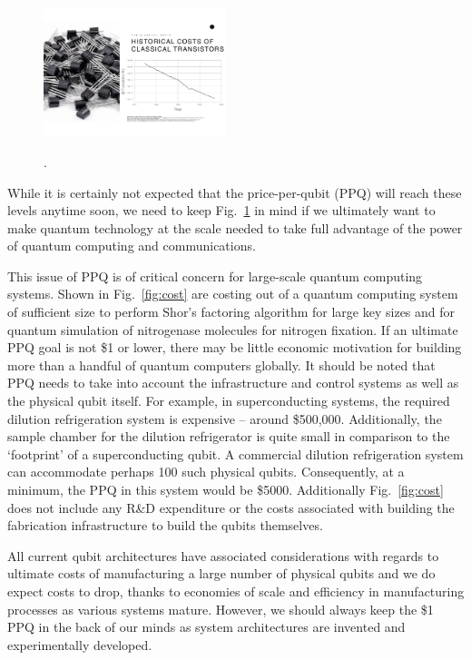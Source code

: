 \documentclass[twocolumn, aps, rmp, amsmath, amssymb, nofootinbib, superscriptaddress, longbibliography, floatfix, table-of-contents, eqsecnum]{revtex4-2}
\begin{document}
\begin{figure}[htbp!]
	\includegraphics[clip=true, width=0.475\textwidth]{cost}
	\caption{} \label{fig:price}.
\end{figure}

While it is certainly not expected that the price-per-qubit (PPQ) will reach these levels anytime soon, we need to keep Fig.~\ref{fig:price} in mind if we ultimately want to make quantum technology at the scale needed to take full advantage of the power of quantum computing and communications. 

This issue of PPQ is of critical concern for large-scale quantum computing systems. Shown in Fig.~\ref{fig:cost} are costing out of a quantum computing system of sufficient size to perform Shor's factoring algorithm for large key sizes and for quantum simulation of nitrogenase molecules for nitrogen fixation. If an ultimate PPQ goal is not \$1 or lower, there may be little economic motivation for building more than a handful of quantum computers globally. It should be noted that PPQ needs to take into account the infrastructure and control systems as well as the physical qubit itself. For example, in superconducting systems, the required dilution refrigeration system is expensive -- around \$500,000. Additionally, the sample chamber for the dilution refrigerator is quite small in comparison to the `footprint' of a superconducting qubit. A commercial dilution refrigeration system can accommodate perhaps 100 such physical qubits. Consequently, at a minimum, the PPQ in this system would be \$5000. Additionally Fig.~\ref{fig:cost} does not include any R\&D expenditure or the costs associated with building the fabrication infrastructure to build the qubits themselves. 

All current qubit architectures have associated considerations with regards to ultimate costs of manufacturing a large number of physical qubits and we do expect costs to drop, thanks to economies of scale and efficiency in manufacturing processes as various systems mature. However, we should always keep the \$1 PPQ in the back of our minds as system architectures are invented and experimentally developed. 
\end{document}
